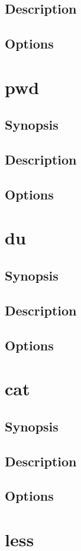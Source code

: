 \documentclass[a4paper, 10pt, onecolumn, openright, oneside]{book}
\begin{document}
			\subsection{Description}
			\subsection{Options}
		\section{pwd}
			\subsection{Synopsis}
			\subsection{Description}
			\subsection{Options}
		\section{du}
			\subsection{Synopsis}
			\subsection{Description}
			\subsection{Options}
		\section{cat}
			\subsection{Synopsis}
			\subsection{Description}
			\subsection{Options}
		\section{less}
\end{document}
